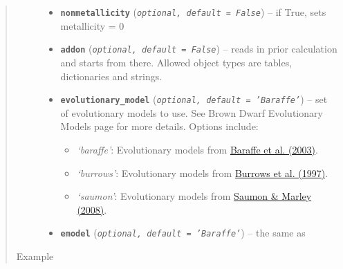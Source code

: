 \documentclass[letterpaper,10pt,english]{sphinxmanual}
\begin{document}
\begin{fulllineitems}
\begin{quote}
\begin{description}
\begin{itemize}
\item {} 
\textbf{\texttt{nonmetallicity}} (\emph{\texttt{optional, default = False}}) -- if True, sets metallicity = 0

\item {} 
\textbf{\texttt{addon}} (\emph{\texttt{optional, default = False}}) -- reads in prior calculation and starts from there. Allowed object types are tables, dictionaries and strings.

\item {} 
\textbf{\texttt{evolutionary\_model}} (\emph{\texttt{optional, default = 'Baraffe'}}) -- 
set of evolutionary models to use. See Brown Dwarf Evolutionary Models page for
more details. Options include:
\begin{itemize}
\item {} 
\emph{`baraffe'}: Evolutionary models from \href{http://arxiv.org/abs/astro-ph/0302293}{Baraffe et al. (2003)}.

\item {} 
\emph{`burrows'}: Evolutionary models from \href{http://adsabs.harvard.edu/abs/1997ApJ...491..856B}{Burrows et al. (1997)}.

\item {} 
\emph{`saumon'}: Evolutionary models from \href{http://adsabs.harvard.edu/abs/2008ApJ...689.1327S}{Saumon \& Marley (2008)}.

\end{itemize}


\item {} 
\textbf{\texttt{emodel}} (\emph{\texttt{optional, default = 'Baraffe'}}) -- the same as 

\end{itemize}

\item[{Example}] \leavevmode
\end{description}\end{quote}


\end{fulllineitems}
\end{document}
